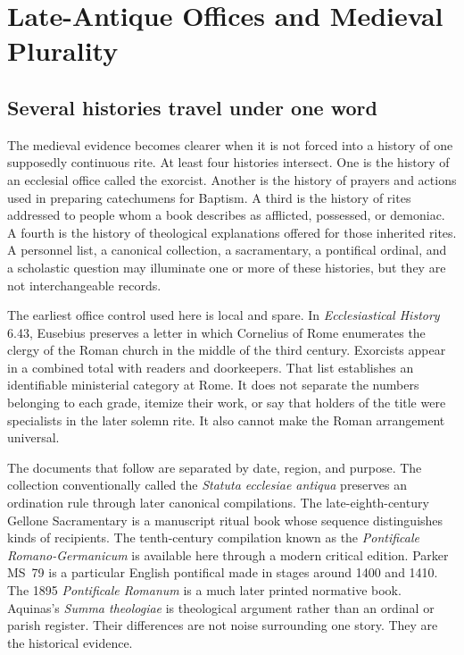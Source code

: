 \section{Late-Antique Offices and Medieval Plurality}

\subsection{Several histories travel under one word}

The medieval evidence becomes clearer when it is not forced into a history of
one supposedly continuous rite. At least four histories intersect. One is the
history of an ecclesial office called the exorcist. Another is the history of
prayers and actions used in preparing catechumens for Baptism. A third is the
history of rites addressed to people whom a book describes as afflicted,
possessed, or demoniac. A fourth is the history of theological explanations
offered for those inherited rites. A personnel list, a canonical collection, a
sacramentary, a pontifical ordinal, and a scholastic question may illuminate
one or more of these histories, but they are not interchangeable records.

The earliest office control used here is local and spare. In
\emph{Ecclesiastical History} 6.43, Eusebius preserves a letter in which
Cornelius of Rome enumerates the clergy of the Roman church in the middle of
the third century. Exorcists appear in a combined total with readers and
doorkeepers. That list establishes an identifiable ministerial category at
Rome. It does not separate the numbers belonging to each grade, itemize their
work, or say that holders of the title were specialists in the later solemn
rite. It also cannot make the Roman arrangement universal.

The documents that follow are separated by date, region, and purpose. The
collection conventionally called the \emph{Statuta ecclesiae antiqua}
preserves an ordination rule through later canonical compilations. The
late-eighth-century Gellone Sacramentary is a manuscript ritual book whose
sequence distinguishes kinds of recipients. The tenth-century compilation
known as the \emph{Pontificale Romano-Germanicum} is available here through a
modern critical edition. Parker MS~79 is a particular English pontifical made
in stages around 1400 and 1410. The 1895 \emph{Pontificale Romanum} is a much
later printed normative book. Aquinas's \emph{Summa theologiae} is theological
argument rather than an ordinal or parish register. Their differences are not
noise surrounding one story. They are the historical evidence.

